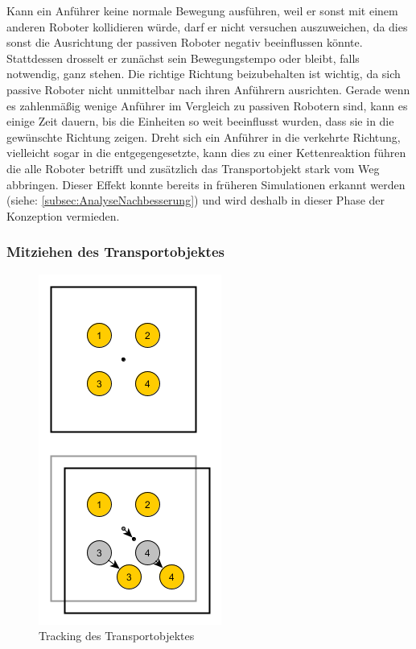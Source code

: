 Kann ein Anführer keine normale Bewegung ausführen, weil er sonst mit einem anderen Roboter kollidieren würde, darf er nicht versuchen auszuweichen, da dies sonst die Ausrichtung der passiven Roboter negativ beeinflussen könnte. Stattdessen drosselt er zunächst sein Bewegungstempo oder bleibt, falls notwendig, ganz stehen. Die richtige Richtung beizubehalten ist wichtig, da sich passive Roboter nicht unmittelbar nach ihren Anführern ausrichten. Gerade wenn es zahlenmäßig wenige Anführer im Vergleich zu passiven Robotern sind, kann es einige Zeit dauern, bis die Einheiten so weit beeinflusst wurden, dass sie in die gewünschte Richtung zeigen. Dreht sich ein Anführer in die verkehrte Richtung, vielleicht sogar in die entgegengesetzte, kann dies zu einer Kettenreaktion führen die alle Roboter betrifft und zusätzlich das Transportobjekt stark vom Weg abbringen. Dieser Effekt konnte bereits in früheren Simulationen erkannt werden (siehe: \autoref{subsec:AnalyseNachbesserung}) und wird deshalb in dieser Phase der Konzeption vermieden.

\subsubsection*{Mitziehen des Transportobjektes}

\begin{figure}
	\includegraphics[width=\pictureWidth,keepaspectratio]{graphics/Transport/Tracking.png}
	\caption{Tracking des Transportobjektes}
	\label{pic:TrackingTransportobjekt}
\end{figure}

